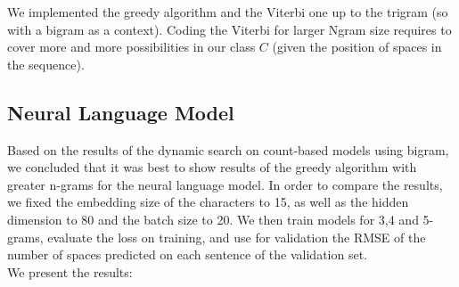 \documentclass[11pt]{article}
\begin{document}
We implemented the greedy algorithm and the Viterbi one up to the trigram (so with a bigram as a context). Coding the Viterbi for larger Ngram size requires to cover more and more possibilities in our class $C$ (given the position of spaces in the sequence). 


\subsection{Neural Language Model}
Based on the results of the dynamic search on count-based models using bigram, we concluded that it was best to show results of the greedy algorithm with greater n-grams for the neural language model. In order to compare the results, we fixed the embedding size of the characters to 15, as well as the hidden dimension to 80 and the batch size to 20. We then train models for 3,4 and 5-grams, evaluate the loss on training, and use for validation the RMSE of the number of spaces predicted on each sentence of the validation set.\\

We present the results:
\end{document}
